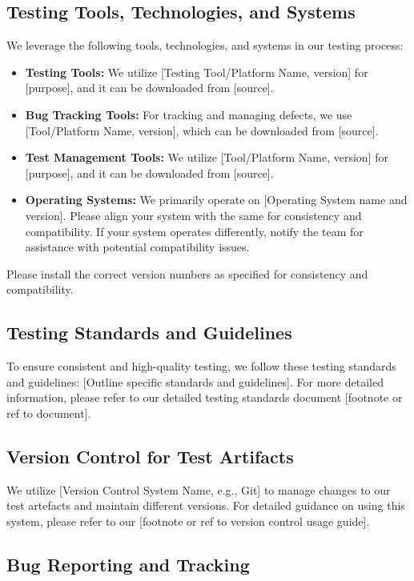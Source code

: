 \documentclass[10pt]{projectdoc}
\begin{document}
\subsection{Testing Tools, Technologies, and Systems}

We leverage the following tools, technologies, and systems in our testing process:

\begin{itemize}
\item \textbf{Testing Tools:} We utilize [Testing Tool/Platform Name, version] for [purpose], and it can be downloaded from [source].
\item \textbf{Bug Tracking Tools:} For tracking and managing defects, we use [Tool/Platform Name, version], which can be downloaded from [source].
\item \textbf{Test Management Tools:} We utilize [Tool/Platform Name, version] for [purpose], and it can be downloaded from [source].
\item \textbf{Operating Systems:} We primarily operate on [Operating System name and version]. Please align your system with the same for consistency and compatibility. If your system operates differently, notify the team for assistance with potential compatibility issues.
\end{itemize}

Please install the correct version numbers as specified for consistency and compatibility.

\subsection{Testing Standards and Guidelines}

To ensure consistent and high-quality testing, we follow these testing standards and guidelines: [Outline specific standards and guidelines]. For more detailed information, please refer to our detailed testing standards document [footnote or ref to document].

\subsection{Version Control for Test Artifacts}

We utilize [Version Control System Name, e.g., Git] to manage changes to our test artefacts and maintain different versions. For detailed guidance on using this system, please refer to our [footnote or ref to version control usage guide].

\subsection{Bug Reporting and Tracking}
\end{document}
